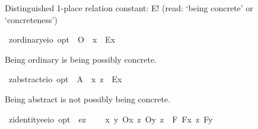 \begin{isabellebody}
\begin{isamarkuptext}
Distinguished 1-place relation constant: E! (read: ‘being concrete’ or ‘concreteness’)%
\end{isamarkuptext}%
\isamarkuptrue%
\isamarkupfalse%
\ z{\isacharunderscore}ordinary{\isacharcolon}{\isacharcolon}{\isachardoublequoteopen}{\isacharparenleft}e{\isasymRightarrow}io{\isacharparenright}\ opt{\isachardoublequoteclose}\ \ {\isachardoublequoteopen}O\isactrlsup {\isacharbang}\ {\isasymequiv}\ {\isasymlambda}x{\isachardot}\ {\isasymdiamond}\ {\isacharless}{\isachardot}E{\isachardot}{\isasymbullet}{\isachardot}x{\isachardot}{\isachargreater}{\isacharparenright}{\isachardoublequoteclose}%
\begin{isamarkuptext}%
Being ordinary is being possibly concrete.%
\end{isamarkuptext}%
\isamarkuptrue%
\isamarkupfalse%
\ z{\isacharunderscore}abstract{\isacharcolon}{\isacharcolon}{\isachardoublequoteopen}{\isacharparenleft}e{\isasymRightarrow}io{\isacharparenright}\ opt{\isachardoublequoteclose}\ \ {\isachardoublequoteopen}A\isactrlsup {\isacharbang}\ {\isasymequiv}\ {\isasymlambda}x{\isachardot}\ {\isasymnot}\isactrlsup z\ {\isacharparenleft}{\isasymdiamond}\ {\isacharless}{\isachardot}E{\isachardot}{\isasymbullet}{\isachardot}x{\isachardot}{\isachargreater}{\isacharparenright}{\isacharparenright}{\isachardoublequoteclose}%
\begin{isamarkuptext}%
Being abstract is not possibly being concrete.%
\end{isamarkuptext}%
\isamarkuptrue%
\isamarkupfalse%
\ z{\isacharunderscore}identity{\isacharcolon}{\isacharcolon}{\isachardoublequoteopen}{\isacharparenleft}e{\isasymRightarrow}e{\isasymRightarrow}io{\isacharparenright}\ opt{\isachardoublequoteclose}\ \ {\isachardoublequoteopen}{\isacharequal}\isactrlsub e\isactrlsup z\ {\isasymequiv}\ \isanewline
\ \ {\isasymlambda}x\ y{\isachardot}\ {\isacharparenleft}{\isacharparenleft}{\isacharless}O\isactrlsup {\isacharbang}{\isasymbullet}{\isachardot}x{\isachardot}{\isachargreater}\ {\isasymand}\isactrlsup z\ {\isacharless}O\isactrlsup {\isacharbang}{\isasymbullet}{\isachardot}y{\isachardot}{\isachargreater}{\isacharparenright}\ {\isasymand}\isactrlsup z\ {\isasymbox}\ {\isacharparenleft}{\isasymforall}{\isacharparenleft}{\isasymlambda}F{\isachardot}\ {\isacharless}{\isachardot}F{\isachardot}{\isasymbullet}{\isachardot}x{\isachardot}{\isachargreater}\ {\isasymequiv}\isactrlsup z\ {\isacharless}{\isachardot}F{\isachardot}{\isasymbullet}{\isachardot}y{\isachardot}{\isachargreater}{\isacharparenright}{\isacharparenright}{\isacharparenright}{\isacharparenright}{\isachardoublequoteclose}\isanewline

\end{isabellebody}
